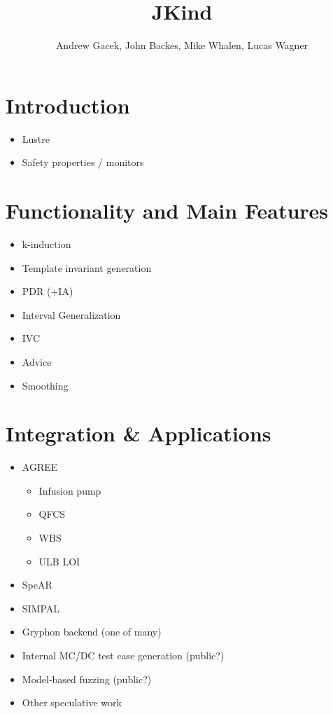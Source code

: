 \documentclass{llncs}
\title{JKind}
\author{Andrew Gacek, John Backes, Mike Whalen, Lucas Wagner}
\begin{document}
\maketitle

\section{Introduction}

\begin{itemize}
\item Lustre
\item Safety properties / monitors
\end{itemize}

\section{Functionality and Main Features}

\begin{itemize}
\item k-induction
\item Template invariant generation
\item PDR (+IA)
\item Interval Generalization
\item IVC
\item Advice
\item Smoothing
\end{itemize}

\section{Integration \& Applications}

\begin{itemize}
\item AGREE
  \begin{itemize}
  \item Infusion pump
  \item QFCS
  \item WBS
  \item ULB LOI
  \end{itemize}
\item SpeAR~\cite{fifarek2017nfm}
\item SIMPAL~\cite{wagner2017spin}
\item Gryphon backend (one of many)
\item Internal MC/DC test case generation (public?)
\item Model-based fuzzing (public?)
\item Other speculative work
\end{itemize}
\end{document}
